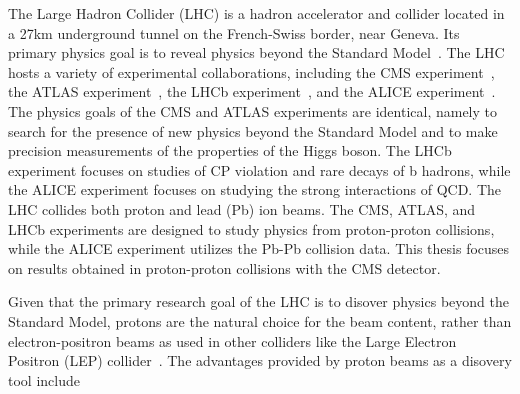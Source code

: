 The Large Hadron Collider (LHC) is a hadron accelerator and collider located in a 27km underground tunnel on the French-Swiss border, near Geneva.
Its primary physics goal is to reveal physics beyond the Standard Model~\cite{Evans_2008}.
The LHC hosts a variety of experimental collaborations, including the CMS experiment~\cite{Chatrchyan:2008aa}, the ATLAS experiment~\cite{Aad:2008zzm}, the LHCb experiment~\cite{Alves:2008zz}, and the ALICE experiment~\cite{Aamodt:2008zz}.
The physics goals of the CMS and ATLAS experiments are identical, namely to search for the presence of new physics beyond the Standard Model and to make precision measurements of the properties of the Higgs boson.
The LHCb experiment focuses on studies of CP violation and rare decays of b hadrons, while the ALICE experiment focuses on studying the strong interactions of QCD.
The LHC collides both proton and lead (Pb) ion beams.
The CMS, ATLAS, and LHCb experiments are designed to study physics from proton-proton collisions, while the ALICE experiment utilizes the Pb-Pb collision data.
This thesis focuses on results obtained in proton-proton collisions with the CMS detector.

Given that the primary research goal of the LHC is to disover physics beyond the Standard Model, protons are the natural choice for the beam content, rather than electron-positron beams as used in other colliders like the Large Electron Positron (LEP) collider~\cite{Taylor:2017edx}.
The advantages provided by proton beams as a disovery tool include 
